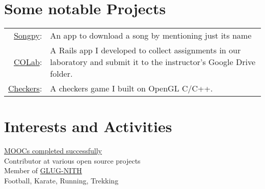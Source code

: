 \documentclass[a4paper,10pt]{article}
\begin{document}
\section{Some notable Projects}
\begin{tabular}{r|p{11cm}}
  \href{https://github.com/lokeshh/songpy}{Songpy}: & An app to download a song by mentioning just its name\\
  \href{https://github.com/lokeshh/colab}{COLab}: & A Rails app I developed to collect assignments in our laboratory and submit it to the instructor's Google Drive folder.\\
  \href{https://github.com/lokeshh/checkers}{Checkers}: & A checkers game I built on OpenGL C/C++.
\end{tabular}

\section{Interests and Activities}
\href{https://gist.github.com/lokeshh/3d1da1104bba06708b65}{MOOCs completed successfully}\\
Contributor at various open source projects\\
Member of \href{glug.nith.ac.in}{GLUG-NITH}\\
Football, Karate, Running, Trekking

\newpage
\end{document}
